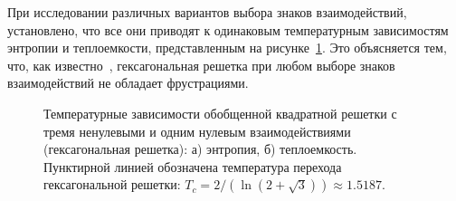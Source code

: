 \documentclass[utf8,12pt]{jetp}
\begin{document}
При исследовании различных вариантов выбора знаков взаимодействий, установлено, что все они приводят к одинаковым температурным зависимостям энтропии и теплоемкости, представленным на рисунке~\ref{Hex}. Это объясняется тем, что, как известно~\cite{houtapell1950}, гексагональная решетка при любом выборе знаков взаимодействий не обладает фрустрациями.

\begin{figure}[h]
	\begin{minipage}[h]{0.5\linewidth}
	\end{minipage}
	\hfill
	\begin{minipage}[h]{0.5\linewidth}
	\end{minipage}
	\caption{Температурные зависимости обобщенной квадратной решетки с тремя ненулевыми и одним нулевым взаимодействиями (гексагональная решетка): а) энтропия, б) теплоемкость. Пунктирной линией обозначена температура перехода гексагональной решетки: $T_c = 2/(\ln(2+\sqrt{3}))\approx 1.5187$.}
	\label{Hex}
\end{figure}
\end{document}
